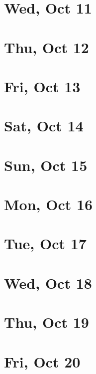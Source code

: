 	\section{Wed, Oct 11}
		
	\section{Thu, Oct 12}
		
	\section{Fri, Oct 13}
		
	\section{Sat, Oct 14}
		
	\section{Sun, Oct 15}
		
	\section{Mon, Oct 16}
		
	\section{Tue, Oct 17}
		
	\section{Wed, Oct 18}
		
	\section{Thu, Oct 19}
		
	\section{Fri, Oct 20}
		
